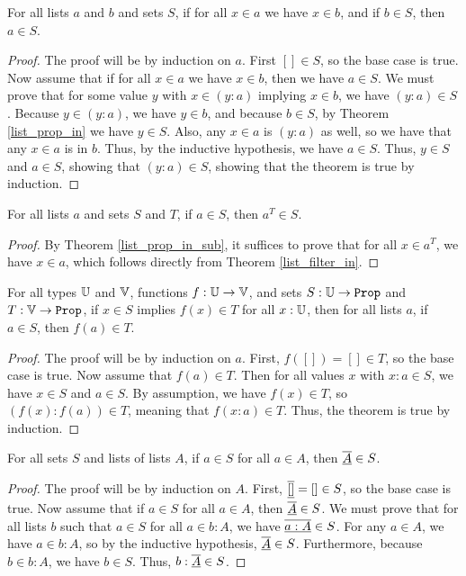 \documentclass[../../math.tex]{subfiles}
\begin{document}
\begin{theorem} \label{list_prop_in_sub}
    For all lists $a$ and $b$ and sets $S$, if for all $x \in a$ we have $x \in
    b$, and if $b \in S$, then $a \in S$.
\end{theorem}
\begin{proof}
    The proof will be by induction on $a$.  First $[] \in S$, so the base case
    is true.  Now assume that if for all $x \in a$ we have $x \in b$, then we
    have $a \in S$.  We must prove that for some value $y$ with $x \in (y : a)$
    implying $x \in b$, we have $(y : a) \in S$.  Because $y \in (y : a)$, we
    have $y \in b$, and because $b \in S$, by Theorem \ref{list_prop_in} we have
    $y \in S$.  Also, any $x \in a$ is $(y : a)$ as well, so we have that any $x
    \in a$ is in $b$.  Thus, by the inductive hypothesis, we have $a \in S$.
    Thus, $y \in S$ and $a \in S$, showing that $(y : a) \in S$, showing that
    the theorem is true by induction.
\end{proof}

\begin{theorem} \label{list_prop_other_filter}
    For all lists $a$ and sets $S$ and $T$, if $a \in S$, then $a^T \in S$.
\end{theorem}
\begin{proof}
    By Theorem \ref{list_prop_in_sub}, it suffices to prove that for all $x \in
    a^T$, we have $x \in a$, which follows directly from Theorem
    \ref{list_filter_in}.
\end{proof}

\begin{theorem} \label{list_prop_image}
    For all types $\mathbb{U}$ and $\mathbb{V}$, functions $f : \mathbb{U} \to \mathbb{V}$, and sets $S : \U \to
    \Prop$ and $T : \V \to \Prop$, if $x \in S$ implies $f(x) \in T$ for all $x
    : \mathbb{U}$, then for all lists $a$, if $a \in S$, then $f(a) \in T$.
\end{theorem}
\begin{proof}
    The proof will be by induction on $a$.  First, $f([]) = [] \in T$, so the
    base case is true.  Now assume that $f(a) \in T$.  Then for all values $x$
    with $x : a \in S$, we have $x \in S$ and $a \in S$.  By assumption, we have
    $f(x) \in T$, so $(f(x) : f(a)) \in T$, meaning that $f(x : a) \in T$.
    Thus, the theorem is true by induction.
\end{proof}

\begin{theorem} \label{list_prop_flatten}
    For all sets $S$ and lists of lists $A$, if $a \in S$ for all $a \in A$,
    then $\underline{\overline{A}} \in S$.
\end{theorem}
\begin{proof}
    The proof will be by induction on $A$.  First, $\underline{\overline{[]}} = [] \in S$, so
    the base case is true.  Now assume that if $a \in S$ for all $a \in A$, then
    $\underline{\overline{A}} \in S$.  We must prove that for all lists $b$ such that $a \in
    S$ for all $a \in b : A$, we have $\underline{\overline{a : A}} \in S$.  For any $a \in
    A$, we have $a \in b : A$, so by the inductive hypothesis, $\underline{\overline{A}} \in
    S$.  Furthermore, because $b \in b : A$, we have $b \in S$.  Thus, $b :
    \underline{\overline{A}} \in S$.
\end{proof}
\end{document}
